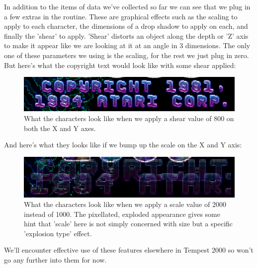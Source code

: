 In addition to the items of data we've collected so far we can see that we plug in a few extras in the 
routine. These are graphical effects such as the scaling to apply to each character, the dimensions of a drop shadow
to apply on each, and finally the 'shear' to apply. 'Shear' distorts an object along the depth or 'Z' axis to make it
appear like we are looking at it at an angle in 3 dimensions. The only one of these parameters we using is the scaling,
for the rest we just plug in zero. But here's what the copyright text would look like with some shear applied:

\begin{figure}[H]
    \centering
    \begin{adjustbox}{width=9cm,center}
      \includegraphics[width=12cm]{src/characters/shear.png}%
    \end{adjustbox}
\caption{What the characters look like when we apply a shear value of 800 on both the X and Y axes.}
\end{figure}

And here's what they looks like if we bump up the scale on the X and Y axis:

\begin{figure}[H]
    \centering
    \begin{adjustbox}{width=9cm,center}
      \includegraphics[width=12cm]{src/characters/scale.png}%
    \end{adjustbox}
\caption{What the characters look like when we apply a scale value of 2000 instead of 1000. The pixellated, exploded appearance 
  gives some hint that 'scale' here is not simply concerned with size but a specific 'explosion
  type' effect.}
\end{figure}

We'll encounter effective use of these features elsewhere in Tempest 2000 so won't go any further into them for now.

